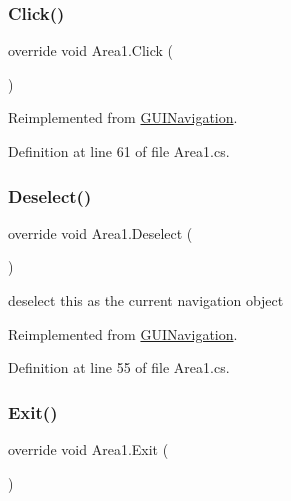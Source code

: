\subsubsection{\texorpdfstring{Click()}{Click()}}
{\footnotesize\ttfamily override void Area1.\+Click (\begin{DoxyParamCaption}{ }\end{DoxyParamCaption})\hspace{0.3cm}{\ttfamily [virtual]}}



Reimplemented from \mbox{\hyperlink{class_g_u_i_navigation_a175178a8bf2832e74c13f83bf8e8f714}{G\+U\+I\+Navigation}}.



Definition at line 61 of file Area1.\+cs.

\mbox{\label{class_area1_a3acaa8f39aa82c44a227cd908509eb23}} 
\subsubsection{\texorpdfstring{Deselect()}{Deselect()}}
{\footnotesize\ttfamily override void Area1.\+Deselect (\begin{DoxyParamCaption}{ }\end{DoxyParamCaption})\hspace{0.3cm}{\ttfamily [virtual]}}



deselect this as the current navigation object 



Reimplemented from \mbox{\hyperlink{class_g_u_i_navigation_a98563f06446b45814ff78978b472e948}{G\+U\+I\+Navigation}}.



Definition at line 55 of file Area1.\+cs.

\mbox{\label{class_area1_afe0c3d9815116a2467fb75b4c2e71df7}} 
\subsubsection{\texorpdfstring{Exit()}{Exit()}}
{\footnotesize\ttfamily override void Area1.\+Exit (\begin{DoxyParamCaption}{ }\end{DoxyParamCaption})\hspace{0.3cm}{\ttfamily [virtual]}}



